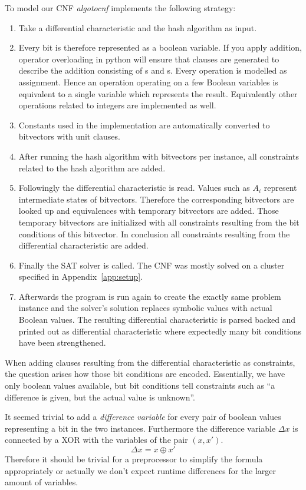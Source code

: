 To model our CNF \emph{algotocnf} implements the following strategy:
\begin{enumerate}
  \item Take a differential characteristic and the hash algorithm as input.
  \item Every bit is therefore represented as a boolean variable.
    If you apply addition, operator overloading in python will ensure
    that clauses are generated to describe the addition consisting of
    s and s. Every operation is modelled as assignment.
    Hence an operation operating on a few Boolean variables is equivalent
    to a single variable which represents the result.
    Equivalently other operations related to integers are implemented as well.
  \item Constants used in the implementation are automatically converted
    to bitvectors with unit clauses.
  \item After running the hash algorithm with bitvectors per instance,
    all constraints related to the hash algorithm are added.
  \item Followingly the differential characteristic is read. Values such as $A_i$
    represent intermediate states of bitvectors. Therefore the corresponding bitvectors
    are looked up and equivalences with temporary bitvectors are added.
    Those temporary bitvectors are initialized with all constraints resulting from
    the bit conditions of this bitvector.
    In conclusion all constraints resulting from the differential characteristic are added.
  \item Finally the SAT solver is called. The CNF was mostly solved on a cluster
    specified in Appendix~\ref{app:setup}.
  \item Afterwards the program is run again to
    create the exactly same problem instance and the solver's solution replaces
    symbolic values with actual Boolean values. The resulting differential
    characteristic is parsed backed and printed out as differential characteristic
    where expectedly many bit conditions have been strengthened.
\end{enumerate}

When adding clauses resulting from
the differential characteristic as constraints, the question arises how those
bit conditions are encoded. Essentially, we have only boolean values available,
but bit conditions tell constraints such as \enquote{a difference is given,
but the actual value is unknown}.

It seemed trivial to add a \emph{difference variable} for every pair of boolean
values representing a bit in the two instances. Furthermore the difference
variable $\Delta x$ is connected by a XOR with the variables of the pair $(x, x')$.
\[ \Delta x = x \oplus x' \]
Therefore it should be trivial for a preprocessor to simplify the formula
appropriately or actually we don't expect runtime differences for the larger
amount of variables.

